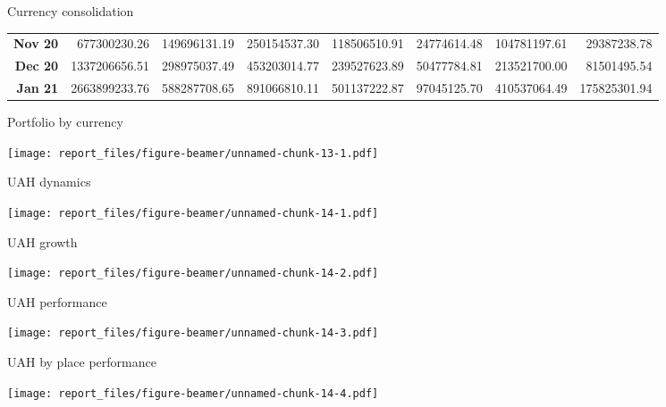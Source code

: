 \documentclass[ignorenonframetext,]{beamer}
\begin{document}
\begin{frame}{Currency consolidation}
\begin{table}[ht]
{\begin{tabular}{rrrrrrrr}
  {\textbf{Nov 20}} & 677300230.26 & 149696131.19 & 250154537.30 & 118506510.91 & 24774614.48 & 104781197.61 & 29387238.78 \\ 
  {\textbf{Dec 20}} & 1337206656.51 & 298975037.49 & 453203014.77 & 239527623.89 & 50477784.81 & 213521700.00 & 81501495.54 \\ 
  {\textbf{Jan 21}} & 2663899233.76 & 588287708.65 & 891066810.11 & 501137222.87 & 97045125.70 & 410537064.49 & 175825301.94 \\ 
   \hline
\end{tabular}
}
\end{table}

\end{frame}

\begin{frame}{Portfolio by currency}
\protect\hypertarget{portfolio-by-currency}{}

\texttt{[image: report\_files/figure-beamer/unnamed-chunk-13-1.pdf]}

\end{frame}

\begin{frame}{UAH dynamics}
\protect\hypertarget{uah-dynamics}{}

\texttt{[image: report\_files/figure-beamer/unnamed-chunk-14-1.pdf]}

\end{frame}

\begin{frame}{UAH growth}
\protect\hypertarget{uah-growth}{}

\texttt{[image: report\_files/figure-beamer/unnamed-chunk-14-2.pdf]}

\end{frame}

\begin{frame}{UAH performance}
\protect\hypertarget{uah-performance}{}

\texttt{[image: report\_files/figure-beamer/unnamed-chunk-14-3.pdf]}

\end{frame}

\begin{frame}{UAH by place performance}
\protect\hypertarget{uah-by-place-performance}{}

\texttt{[image: report\_files/figure-beamer/unnamed-chunk-14-4.pdf]}

\end{frame}
\end{document}
